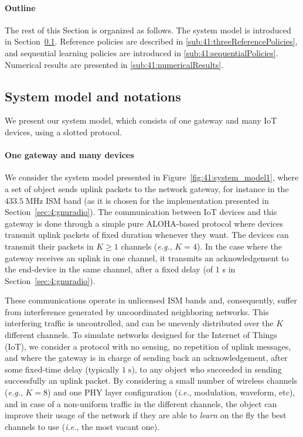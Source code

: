 \paragraph{Outline}
The rest of this Section is organized as follows. The system model is introduced in Section~\ref{sub:41:systemModel}. Reference policies are described in \ref{sub:41:threeReferencePolicies}, and sequential learning policies are introduced in \ref{sub:41:sequentialPolicies}.
Numerical results are presented in \ref{sub:41:numericalResults}.


\subsection{System model and notations}\label{sub:41:systemModel}

We present our system model, which consists of one gateway and many IoT devices, using a slotted protocol.

\paragraph{One gateway and many devices}
%
We consider the system model presented in Figure~\ref{fig:41:system_model1}, where a set of object sends uplink packets to the network gateway, for instance in the $433.5\;\mathrm{MHz}$ ISM band (as it is chosen for the implementation presented in Section~\ref{sec:4:gnuradio}).
The communication between IoT devices and this gateway is done through a simple pure ALOHA-based protocol where devices transmit uplink packets of fixed duration whenever they want.
%
The devices can transmit their packets in $K\geq 1$ channels (\emph{e.g.}, $K=4$). In the case where the gateway receives an uplink in one channel, it transmits an acknowledgement to the end-device in the same channel, after a fixed delay (of $1$ s in Section~\ref{sec:4:gnuradio}).

These communications operate in unlicensed ISM bands and, consequently, suffer from interference generated by uncoordinated neighboring networks. This interfering traffic is uncontrolled, and can be unevenly distributed over the $K$ different channels.
%
To simulate networks designed for the Internet of Things (IoT), we consider a protocol with no sensing, no repetition of uplink messages, and where the gateway is in charge of sending back an acknowledgement, after some fixed-time delay (typically $1\;\mathrm{s}$), to any object who succeeded in sending successfully an uplink packet.
%
By considering a small number of wireless channels (\emph{e.g.}, $K=8$) and one PHY layer configuration (\emph{i.e.}, modulation, waveform, etc), and in case of a non-uniform traffic in the different channels,
the object can improve their usage of the network if they are able to \emph{learn} on the fly the best channels to use (\emph{i.e.}, the most vacant one).

